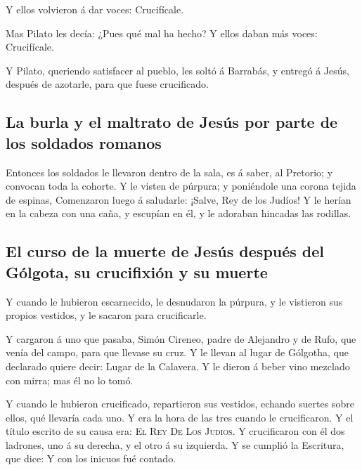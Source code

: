  Y ellos volvieron á dar voces: Crucifícale.

 Mas Pilato les decía: ¿Pues qué mal ha hecho? Y ellos
daban más voces: Crucifícale.

 Y Pilato, queriendo satisfacer al pueblo, les soltó á
Barrabás, y entregó á Jesús, después de azotarle, para que fuese
crucificado.

\hypertarget{la-burla-y-el-maltrato-de-jesuxfas-por-parte-de-los-soldados-romanos}{%
\subsection{La burla y el maltrato de Jesús por parte de los soldados
romanos}\label{la-burla-y-el-maltrato-de-jesuxfas-por-parte-de-los-soldados-romanos}}

 Entonces los soldados le llevaron dentro de la sala, es
á saber, al Pretorio; y convocan toda la cohorte.  Y le
visten de púrpura; y poniéndole una corona tejida de espinas,
 Comenzaron luego á saludarle: ¡Salve, Rey de los Judíos!
 Y le herían en la cabeza con una caña, y escupían en él,
y le adoraban hincadas las rodillas.

\hypertarget{el-curso-de-la-muerte-de-jesuxfas-despuuxe9s-del-guxf3lgota-su-crucifixiuxf3n-y-su-muerte}{%
\subsection{El curso de la muerte de Jesús después del Gólgota, su
crucifixión y su
muerte}\label{el-curso-de-la-muerte-de-jesuxfas-despuuxe9s-del-guxf3lgota-su-crucifixiuxf3n-y-su-muerte}}

 Y cuando le hubieron escarnecido, le desnudaron la
púrpura, y le vistieron sus propios vestidos, y le sacaron para
crucificarle.

 Y cargaron á uno que pasaba, Simón Cireneo, padre de
Alejandro y de Rufo, que venía del campo, para que llevase su cruz.
 Y le llevan al lugar de Gólgotha, que declarado quiere
decir: Lugar de la Calavera.  Y le dieron á beber vino
mezclado con mirra; mas él no lo tomó.

 Y cuando le hubieron crucificado, repartieron sus
vestidos, echando suertes sobre ellos, qué llevaría cada uno.
 Y era la hora de las tres cuando le crucificaron.
 Y el título escrito de su causa era: \textsc{El}
\textsc{Rey} \textsc{De} \textsc{Los} \textsc{Judios}.  Y
crucificaron con él dos ladrones, uno á su derecha, y el otro á su
izquierda.  Y se cumplió la Escritura, que dice: Y con
los inicuos fué contado.

